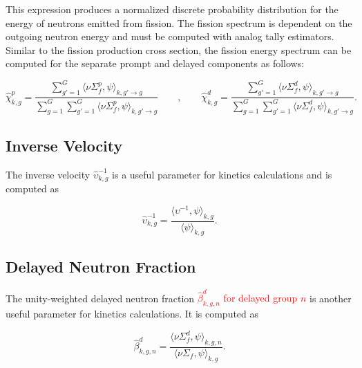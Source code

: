 \noindent This expression produces a normalized discrete probability distribution for the energy of neutrons emitted from fission. The fission spectrum is dependent on the outgoing neutron energy and must be computed with analog tally estimators. Similar to the fission production cross section, the fission energy spectrum can be computed for the separate prompt and delayed components as follows:

\begin{equation}
\label{eqn:chi-specific}
\hat{\chi}_{k,g}^{p} = \frac{\displaystyle\sum\limits_{g'=1}^{G} \langle \nu\Sigma_{f}^{p}, \psi \rangle_{k,g'\rightarrow g}}{\displaystyle\sum\limits_{g=1}^{G} \displaystyle\sum\limits_{g'=1}^{G} \langle \nu\Sigma_{f}^{p}, \psi \rangle_{k,g'\rightarrow g}} \qquad , \qquad \hat{\chi}_{k,g}^{d} = \frac{\displaystyle\sum\limits_{g'=1}^{G} \langle \nu\Sigma_{f}^{d}, \psi \rangle_{k,g'\rightarrow g}}{\displaystyle\sum\limits_{g=1}^{G} \displaystyle\sum\limits_{g'=1}^{G} \langle \nu\Sigma_{f}^{d}, \psi \rangle_{k,g'\rightarrow g}}.
\end{equation}


\subsection{Inverse Velocity}
\label{subsubsec:tally-types-inv-vel}

The inverse velocity $\hat{\upsilon}_{k,g}^{-1}$ is a useful parameter for kinetics calculations and is computed as

\begin{equation}
\label{eqn:inverse-velocity}
\hat{\upsilon}_{k,g}^{-1} = \frac{\langle \upsilon^{-1}, \psi \rangle_{k,g}}{\langle \psi \rangle_{k,g}}.
\end{equation}

\subsection{Delayed Neutron Fraction}
\label{subsubsec:tally-types-beta}

The unity-weighted delayed neutron fraction \textcolor{red}{$\hat{\beta}_{k,g,n}^{d}$ for delayed group $n$} is another useful parameter for kinetics calculations. It is computed as

\begin{equation}
\label{eqn:beta}
\hat{\beta}_{k,g,n}^{d} = \frac{\langle \nu \Sigma_f^d, \psi \rangle_{k,g,n}}{\langle \nu \Sigma_f, \psi \rangle_{k,g}}.
\end{equation}

